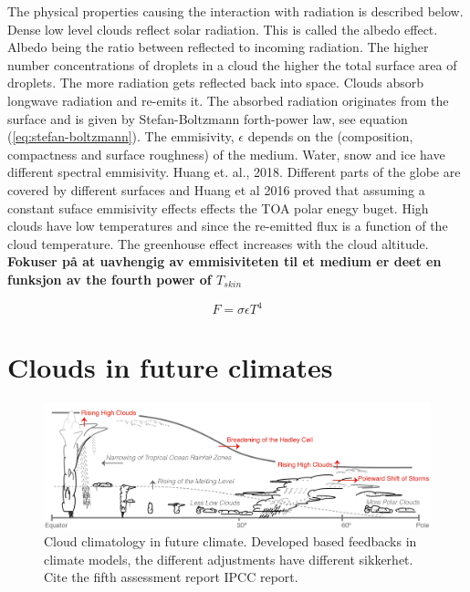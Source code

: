 The physical properties causing the interaction with radiation is described below. Dense low level clouds reflect solar radiation. This is called the albedo effect. Albedo being the ratio between reflected to incoming radiation. The higher number concentrations of droplets in a cloud the higher the total surface area of droplets. The more radiation gets reflected back into space. Clouds absorb longwave radiation and re-emits it. The absorbed radiation originates from the surface and is given by Stefan-Boltzmann forth-power law, see equation (\ref{eq:stefan-boltzmann}). The emmisivity, $\epsilon$ depends on the (composition, compactness and surface roughness) of the medium. Water, snow and ice have different spectral emmisivity. Huang et. al., 2018. Different parts of the globe are covered by different surfaces and Huang et al 2016 proved that assuming a constant suface emmisivity effects effects the TOA polar enegy buget. High clouds have low temperatures and since the re-emitted flux is a function of the cloud temperature. The greenhouse effect increases with the cloud altitude.
\textbf{Fokuser på at uavhengig av emmisiviteten til et medium er deet en funksjon av the fourth power of $T_{skin}$}

\begin{equation} \label{eq:stefan-boltzmann}
    F = \sigma \epsilon T ^4
\end{equation}

\section{Clouds in future climates} \label{sec:intro_cloud_future_climates}
\begin{figure}[h]
    \centering
    \includegraphics[scale = 0.8]{Chapter1_Intro/images/Fig7-11_ipcc.jpg}
    \caption{Cloud climatology in future climate. Developed based feedbacks in climate models, the different adjustments have different sikkerhet. Cite the fifth assessment report IPCC report.}
    \label{fig:cloud_scheme}
\end{figure}


